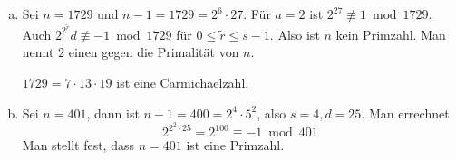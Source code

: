 
\begin{ex} \label{3.20}
	\begin{enumerate}[a)]
		\item
			Sei $n = 1729$ und $n - 1 = 1729 = 2^6 \cdot 27$.
			Für $a = 2$ ist $2^{27} \not\equiv 1 \bmod 1729$.
			Auch $2^{2^{\tilde r}} d \not\equiv -1 \bmod 1729$ für $0 \le \tilde r \le s-1$.
			Also ist $n$ kein Primzahl.
			Man nennt $2$ einen  gegen die Primalität von $n$.

			$1729 = 7 \cdot 13 \cdot 19$ ist eine Carmichaelzahl.
		\item
			Sei $n = 401$, dann ist $n - 1 = 400 = 2^4 \cdot 5^2$, also $s = 4, d = 25$.
			Man errechnet
			\[
				2^{2^2 \cdot 25} = 2^{100} \equiv -1 \bmod 401
			\]
			Man stellt fest, dass $n = 401$ ist eine Primzahl.
	\end{enumerate}
\end{ex}

